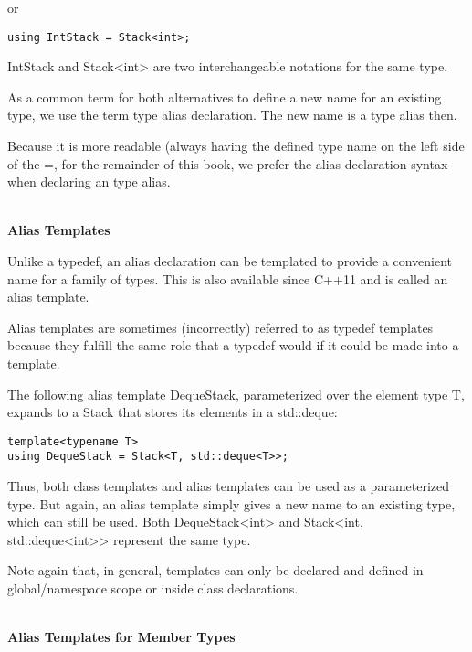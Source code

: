 or

\begin{lstlisting}[style=styleCXX]
using IntStack = Stack<int>;
\end{lstlisting}

IntStack and Stack<int> are two interchangeable notations for the same type.

As a common term for both alternatives to define a new name for an existing type, we use the term type alias declaration. The new name is a type alias then.

Because it is more readable (always having the defined type name on the left side of the =, for the remainder of this book, we prefer the alias declaration syntax when declaring an type alias.

\hspace*{\fill} \\ %
\noindent
\textbf{Alias Templates}

Unlike a typedef, an alias declaration can be templated to provide a convenient name for a family of types. This is also available since C++11 and is called an alias template.

\begin{tcolorbox}[colback=webgreen!5!white,colframe=webgreen!75!black]
\hspace*{0.75cm}Alias templates are sometimes (incorrectly) referred to as typedef templates because they fulfill the same role that a typedef would if it could be made into a template.
\end{tcolorbox}

The following alias template DequeStack, parameterized over the element type T, expands to a Stack that stores its elements in a std::deque:

\begin{lstlisting}[style=styleCXX]
template<typename T>
using DequeStack = Stack<T, std::deque<T>>;
\end{lstlisting}

Thus, both class templates and alias templates can be used as a parameterized type. But again, an alias template simply gives a new name to an existing type, which can still be used. Both DequeStack<int> and Stack<int, std::deque<int>> represent the same type.

Note again that, in general, templates can only be declared and defined in global/namespace scope or inside class declarations.

\hspace*{\fill} \\ %
\noindent
\textbf{Alias Templates for Member Types}

